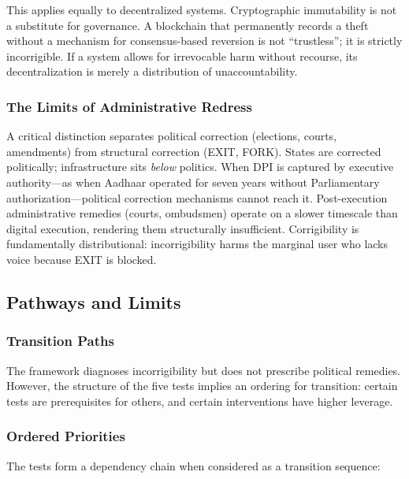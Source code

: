 This applies equally to decentralized systems. Cryptographic immutability is not a substitute for governance. A blockchain that permanently records a theft without a mechanism for consensus-based reversion is not ``trustless''; it is strictly incorrigible. If a system allows for irrevocable harm without recourse, its decentralization is merely a distribution of unaccountability.

\subsubsection{The Limits of Administrative Redress}

A critical distinction separates political correction (elections, courts, amendments) from structural correction (EXIT, FORK). States are corrected politically; infrastructure sits \textit{below} politics. When DPI is captured by executive authority---as when Aadhaar operated for seven years without Parliamentary authorization---political correction mechanisms cannot reach it. Post-execution administrative remedies (courts, ombudsmen) operate on a slower timescale than digital execution, rendering them structurally insufficient. Corrigibility is fundamentally distributional: incorrigibility harms the marginal user who lacks voice because EXIT is blocked.

\subsection{Pathways and Limits}
\label{subsec:pathways}

\subsubsection{Transition Paths}
\label{subsec:transition}

The framework diagnoses incorrigibility but does not prescribe political remedies. However, the structure of the five tests implies an ordering for transition: certain tests are prerequisites for others, and certain interventions have higher leverage.

\subsubsection{Ordered Priorities}

The tests form a dependency chain when considered as a transition sequence:

